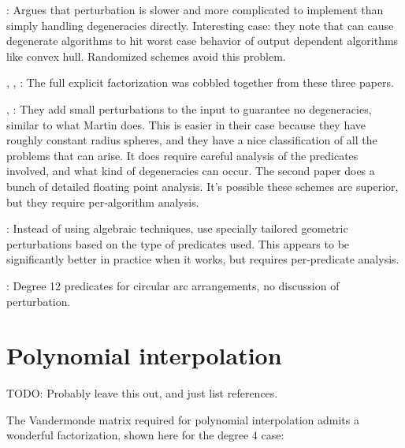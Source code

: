 \documentclass[11pt]{article}
\newcommand{\TODO}{{\color{red} TODO}}
\begin{document}
{\cite{burnikel1994degeneracy}: Argues that perturbation is slower and more complicated to implement than simply handling degeneracies directly.  Interesting case: they note that \cite{emiris1992efficient}
can cause degenerate algorithms to hit worst case behavior of output dependent algorithms like convex hull.  Randomized schemes avoid this problem.


\cite{oruc2000explicit}, \cite{olver2006multivariate}, \cite{neidinger2009multivariable}: The full explicit factorization was cobbled together from these three papers.

\cite{halperin1998perturbation}, \cite{halperin2004controlled}: They add small perturbations to the input to guarantee no degeneracies, similar to what Martin does.
This is easier in their case because they have roughly constant radius spheres, and they have a nice classification of all the problems that can arise.  It does
require careful analysis of the predicates involved, and what kind of degeneracies can occur.  The second paper does a bunch of detailed floating point analysis.
It's possible these schemes are superior, but they require per-algorithm analysis.

\cite{devillers2012qualitative}: Instead of using algebraic techniques, use specially tailored geometric perturbations based on the type of predicates used.  This appears to
be significantly better in practice when it works, but requires per-predicate analysis.


\cite{devillers2000algebraic}: Degree 12 predicates for circular arc arrangements, no discussion of perturbation.

\section{Polynomial interpolation}

\TODO: Probably leave this out, and just list references.

The Vandermonde matrix required for polynomial interpolation admits a wonderful factorization, shown here for the degree 4 case:

}
\end{document}
